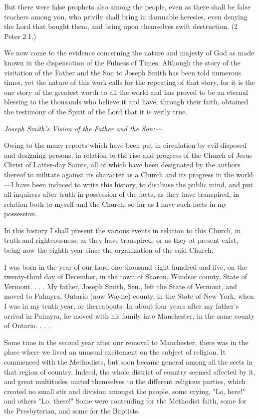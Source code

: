 But there were false prophets also among the people, even as there shall be false teachers
among you, who privily shall bring in damnable heresies, even denying the Lord that bought
them, and bring upon themselves swift destruction. (2 Peter 2:1.)

We now come to the evidence concerning the nature and majesty of God as made known in
the dispensation of the Fulness of Times. Although the story of the visitation of the Father
and the Son to Joseph Smith has been told numerous times, yet the nature of this work calls
for the repeating of that story, for it is the one story of the greatest worth to all the world and
has proved to be an eternal blessing to the thousands who believe it and have, through their
faith, obtained the testimony of the Spirit of the Lord that it is verily true.

\textit{Joseph Smith's Vision of the Father and the Son:—}

Owing to the many reports which have been put in circulation by evil-disposed and designing
persons, in relation to the rise and progress of the Church of Jesus Christ of Latter-day Saints,
all of which have been designated by the authors thereof to militate against its character as a
Church and its progress in the world—I have been induced to write this history, to disabuse
the public mind, and put all inquirers after truth in possession of the facts, as they have
transpired, in relation both to myself and the Church, so far as I have such facts in my
possession.

In this history I shall present the various events in relation to this Church, in truth and
righteousness, as they have transpired, or as they at present exist, being now the eighth year
since the organization of the said Church.

I was born in the year of our Lord one thousand eight hundred and five, on the twenty-third
day of December, in the town of Sharon, Windsor county, State of Vermont. . . . My father,
Joseph Smith, Sen., left the State of Vermont, and moved to Palmyra, Ontario (now Wayne)
county, in the State of New York, when I was in my tenth year, or thereabouts. In about four
years after my father's arrival in Palmyra, he moved with his family into Manchester, in the
same county of Ontario. . . .

Some time in the second year after our removal to Manchester, there was in the place where
we lived an unusual excitement on the subject of religion. It commenced with the Methodists,
but soon became general among all the sects in that region of country. Indeed, the whole
district of country seemed affected by it, and great multitudes united themselves to the
different religious parties, which created no small stir and division amongst the people, some
crying, "Lo, here!" and others "Lo, there!" Some were contending for the Methodist faith,
some for the Presbyterian, and some for the Baptists.

